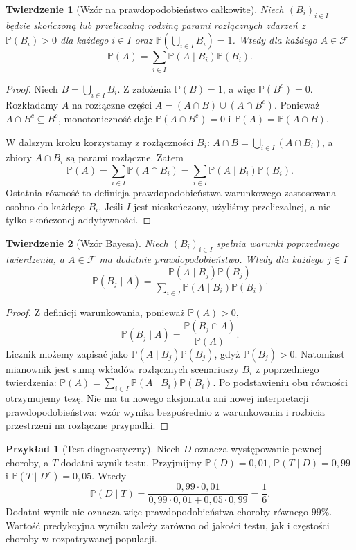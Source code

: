 \documentclass[11pt,a4paper,oneside]{report}
\numberwithin{equation}{chapter}
\theoremstyle{plain}
\newtheorem{twierdzenie}{Twierdzenie}[chapter]
\theoremstyle{definition}
\newtheorem{przyklad}{Przykład}[chapter]
\theoremstyle{remark}
\newcommand{\Prob}{\mathbb{P}}
\begin{document}
\begin{twierdzenie}[Wzór na prawdopodobieństwo całkowite]
Niech $(B_i)_{i\in I}$ będzie skończoną lub przeliczalną rodziną
parami rozłącznych zdarzeń z $\Prob(B_i)>0$ dla każdego $i\in I$
oraz $\Prob(\bigcup_{i\in I}B_i)=1$.
Wtedy dla każdego $A\in\mathcal F$
\begin{equation}\label{eq:totalprob}
\Prob(A)=\sum_{i\in I}\Prob(A\mid B_i)\Prob(B_i).
\end{equation}
\end{twierdzenie}
\begin{proof}
Niech $B=\bigcup_{i\in I}B_i$.
Z założenia $\Prob(B)=1$, a więc $\Prob(B^c)=0$.
Rozkładamy $A$ na rozłączne części
$A=(A\cap B)\mathbin{\dot\cup}(A\cap B^c)$.
Ponieważ $A\cap B^c\subseteq B^c$, monotoniczność
daje $\Prob(A\cap B^c)=0$ i
$\Prob(A)=\Prob(A\cap B)$.

W dalszym kroku korzystamy z rozłączności $B_i$:
$A\cap B=\bigcup_{i\in I}(A\cap B_i)$,
a zbiory $A\cap B_i$ są parami rozłączne. Zatem
\[
\Prob(A)=\sum_{i\in I}\Prob(A\cap B_i)
=\sum_{i\in I}\Prob(A\mid B_i)\Prob(B_i).
\]
Ostatnia równość to definicja prawdopodobieństwa
warunkowego zastosowana osobno do każdego $B_i$.
Jeśli $I$ jest nieskończony, użyliśmy przeliczalnej,
a nie tylko skończonej addytywności.
\end{proof}

\begin{twierdzenie}[Wzór Bayesa]
Niech $(B_i)_{i\in I}$ spełnia warunki poprzedniego twierdzenia,
a $A\in\mathcal F$ ma dodatnie prawdopodobieństwo.
Wtedy dla każdego $j\in I$
\begin{equation}\label{eq:bayes}
\Prob(B_j\mid A)
=\frac{\Prob(A\mid B_j)\Prob(B_j)}
{\sum_{i\in I}\Prob(A\mid B_i)\Prob(B_i)}.
\end{equation}
\end{twierdzenie}
\begin{proof}
Z definicji warunkowania, ponieważ $\Prob(A)>0$,
\[
\Prob(B_j\mid A)=\frac{\Prob(B_j\cap A)}{\Prob(A)}.
\]
Licznik możemy zapisać jako
$\Prob(A\mid B_j)\Prob(B_j)$, gdyż $\Prob(B_j)>0$.
Natomiast mianownik jest sumą wkładów rozłącznych
scenariuszy $B_i$ z poprzedniego twierdzenia:
$\Prob(A)=\sum_{i\in I}\Prob(A\mid B_i)\Prob(B_i)$.
Po podstawieniu obu równości otrzymujemy tezę.
Nie ma tu nowego aksjomatu ani nowej interpretacji
prawdopodobieństwa: wzór wynika bezpośrednio z
warunkowania i rozbicia przestrzeni na rozłączne przypadki.
\end{proof}

\begin{przyklad}[Test diagnostyczny]
Niech $D$ oznacza występowanie pewnej choroby, a $T$ dodatni wynik
testu. Przyjmijmy $\Prob(D)=0{,}01$,
$\Prob(T\mid D)=0{,}99$ i $\Prob(T\mid D^c)=0{,}05$.
Wtedy
\[
\Prob(D\mid T)
=\frac{0{,}99\cdot0{,}01}
{0{,}99\cdot0{,}01+0{,}05\cdot0{,}99}
=\frac16.
\]
Dodatni wynik nie oznacza więc prawdopodobieństwa choroby równego
$99\%$. Wartość predykcyjna wyniku zależy zarówno od jakości testu,
jak i częstości choroby w rozpatrywanej populacji.
\end{przyklad}
\end{document}
